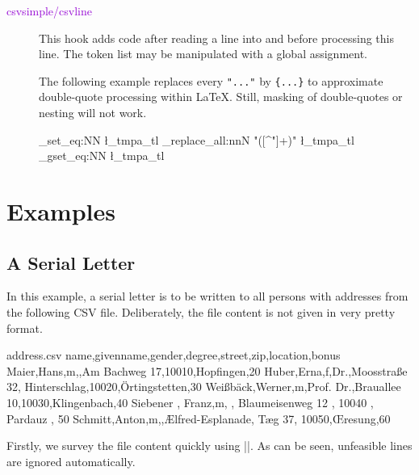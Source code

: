 \documentclass[a4paper,11pt]{ltxdoc}
\begin{document}
\begin{description}
\item[\textcolor{DarkViolet}{\ttfamily csvsimple/csvline}]
  This hook adds code after reading
  a line into  and before processing this line.
  The token list  may be manipulated with a global assignment.\par
  The following example replaces every \verb+"..."+ by \verb+{...}+ to
  approximate double-quote processing within \LaTeX. Still, masking of double-quotes
  or nesting will not work.
\begin{dispListing}
  {
    \tl_set_eq:NN \l_tmpa_tl \csvline
    \regex_replace_all:nnN { "([^"]+)" } { {\1} } \l_tmpa_tl
    \tl_gset_eq:NN \csvline \l_tmpa_tl
  }
\end{dispListing}

\end{description}


\clearpage
\section{Examples}%

\subsection{A Serial Letter}%
In this example, a serial letter is to be written to all persons with
addresses from the following CSV file. Deliberately, the file content is
not given in very pretty format.

\begin{tcbverbatimwrite}{address.csv}
name,givenname,gender,degree,street,zip,location,bonus
Maier,Hans,m,,Am Bachweg 17,10010,Hopfingen,20
Huber,Erna,f,Dr.,{Moosstraße 32, Hinterschlag},10020,Örtingstetten,30
Weißbäck,Werner,m,Prof. Dr.,Brauallee 10,10030,Klingenbach,40
  Siebener ,  Franz,m,   ,  Blaumeisenweg 12  , 10040 ,  Pardauz , 50
Schmitt,Anton,m,,{\AE{}lfred-Esplanade, T\ae{}g 37}, 10050,\OE{}resung,60
\end{tcbverbatimwrite}


Firstly, we survey the file content quickly using
|\csvautotabular|.
As can be seen, unfeasible lines are ignored automatically.
\end{document}

